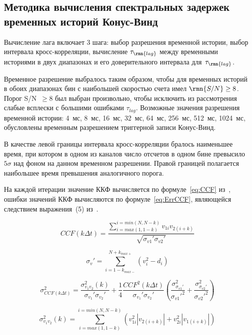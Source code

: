 \subsection{Методика вычисления спектральных задержек временных историй Конус-Винд}
Вычисление лага включает 3 шага: выбор разрешения временной истории, выбор интервала 
кросс-корреляции, вычисление $\tau_{\rmn{lag}}$ между временными историями в двух диапазонах 
и его доверительного интервала для~$\tau_{\rmn{lag}}$. 

Временное разрешение выбралось таким образом, чтобы для временных историй 
в обоих диапазонах бин с наибольшей скоростью счета имел $\rmn{S/N}\geq 8$. 
Порог S/N~$\geq 8$ был выбран произвольно, чтобы исключить из рассмотрения слабые 
всплески с большими ошибками $\tau_{lag}$. Возможные значения разрешения временной 
истории: 4~мс, 8~мс, 16~мс, 32~мс, 64~мс, 256~мс, 512~мс, 1024~мс, обусловлены 
временным разрешением триггерной записи Конус-Винд.

В качестве левой границы интервала кросс-корреляции бралось наименьшее время, 
при котором в одном из каналов число отсчетов в одном бине превысило $5\sigma$ 
над фоном на данном временном разрешении. Правой границей полагается наибольшее 
время превышения аналогичного порога. 

На каждой итерации значение ККФ вычисляется по формуле~\ref{eq:CCF} из~\citep{Band_1997ApJ}, 
ошибки значений ККФ вычисляются по формуле~\ref{eq:ErrCCF}, являющейся следствием выражения~(5) 
из~\citep{Fenimore_1995}.

\begin{equation}\label{eq:CCF}
CCF(k\Delta t) = \frac{\sum^{i=min(N, N-k)}_{i=max(1, 1-k)}v_{1i}v_{2(i+k)}}{\sqrt{\sigma_{v1}'\sigma_{v2}'}}
\end{equation}

\begin{equation}
\sigma_{v}' = \sum_{i=1-k_{max-}}^{N+k_{max+}}(v_i^2 -d_i)
\end{equation}

\begin{equation}\label{eq:ErrCCF}
\sigma_{CCF(k\Delta t)}^2 = \frac{\sigma_{v_1 v_2}^2(k)}{\sigma_{v_1}'\sigma_{v_2}'} 
+ \frac{1}{4}\frac{CCF^2(k\Delta t)}{\sigma_{v_1}'\sigma_{v_2}'}
\left( \frac{\sigma_{\sigma_{v1}'}^2}{\sigma_{v1}'^2} +\frac{\sigma_{\sigma_{v2}'}^2}{\sigma_{v2}'^2} \right)
\end{equation}

\begin{equation}
\sigma_{v_1 v_2}^2(k) = \sum^{i=min(N, N-k)}_{i=max(1, 1-k)} (v_{1i}^2 |v_{2(i+k)}| + v_{2i}^2 |v_{1(i+k)}|)
\end{equation}

